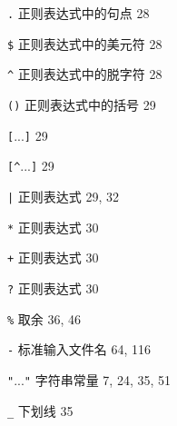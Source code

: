 \begin{multicols}{2}
\verb'.' 正则表达式中的句点 28

\verb'$' 正则表达式中的美元符 28

\verb'^' 正则表达式中的脱字符 28

\verb'()' 正则表达式中的括号 29

\verb'['...\verb']' 29 

\verb'[^'...\verb']' 29

\verb'|' 正则表达式 29, 32

\verb'*' 正则表达式 30

\verb'+' 正则表达式 30

\verb'?' 正则表达式 30 

\verb'%' 取余 36, 46

\verb'-' 标准输入文件名 64, 116

\verb'"'...\verb'"' 字符串常量 7, 24, 35, 51

\verb'_' 下划线 35
\end{multicols}
